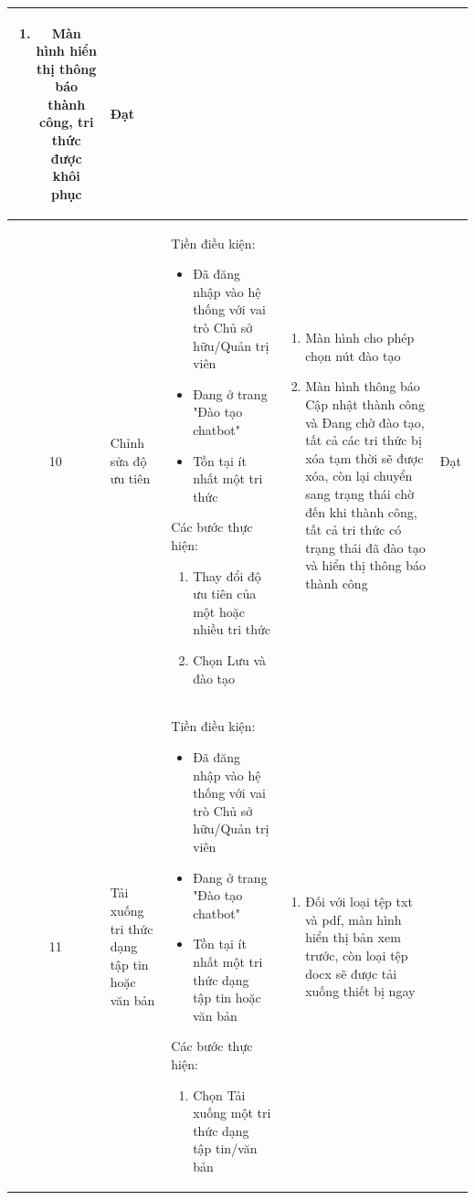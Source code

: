 \begin{longtable}{|c|m{2.5cm}|m{5.5cm}|m{4.5cm}|c|}
\begin{enumerate}[label=\arabic*.]
        \item Màn hình hiển thị thông báo thành công, tri thức được khôi phục
    \end{enumerate}  & Đạt \\
    \hline
    10 & 
    Chỉnh sửa độ ưu tiên & 
    Tiền điều kiện:
    \begin{itemize}
        \item Đã đăng nhập vào hệ thống với vai trò Chủ sở hữu/Quản trị viên
        \item Đang ở trang "Đào tạo chatbot"
        \item Tồn tại ít nhất một tri thức
    \end{itemize}
    Các bước thực hiện: 
    \begin{enumerate}[label=\arabic*.]
        \item Thay đổi độ ưu tiên của một hoặc nhiều tri thức
        \item Chọn Lưu và đào tạo
    \end{enumerate}
    & 
    \begin{enumerate}[label=\arabic*.]
        \item Màn hình cho phép chọn nút đào tạo
        \item Màn hình thông báo Cập nhật thành công và Đang chờ đào tạo, tất cả các tri thức bị xóa tạm thời sẽ được xóa, còn lại chuyển sang trạng thái chờ đến khi thành công, tất cả tri thức có trạng thái đã đào tạo và hiển thị thông báo thành công
    \end{enumerate}  & Đạt \\
    \hline
    11 & 
    Tải xuống tri thức dạng tập tin hoặc văn bản & 
    Tiền điều kiện:
    \begin{itemize}
        \item Đã đăng nhập vào hệ thống với vai trò Chủ sở hữu/Quản trị viên
        \item Đang ở trang "Đào tạo chatbot"
        \item Tồn tại ít nhất một tri thức dạng tập tin hoặc văn bản
    \end{itemize}
    Các bước thực hiện: 
    \begin{enumerate}[label=\arabic*.]
        \item Chọn Tải xuống một tri thức dạng tập tin/văn bản
    \end{enumerate}
    & 
    \begin{enumerate}[label=\arabic*.]
        \item Đối với loại tệp txt và pdf, màn hình hiển thị bản xem trước, còn loại tệp docx sẽ được tải xuống thiết bị ngay

\end{enumerate}
\end{longtable}
